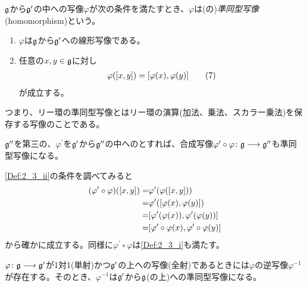 \documentclass[../main]{subfiles}
\begin{document}
\begin{definition}[準同型写像]\label{Def:2_3}
  $\mathfrak{g}$から$\mathfrak{g}^\prime$の中への写像$\varphi$が次の条件を満たすとき、$\varphi$は({}の)\emph{準同型写像}(homomorphism)という。
  \begin{enumerate}[label=(\roman*)]
    \item \label{Def:2_3_i}$\varphi$は$\mathfrak{g}$から$\mathfrak{g}^\prime$への線形写像である。
    \item \label{Def:2_3_ii}任意の$x,y\in\mathfrak{g}$に対し
      \begin{align*}
        \varphi\qty(\comm{x}{y}) = \comm{\varphi(x)}{\varphi(y)}\tag{7}\label{eq:2_(7)}
      \end{align*}
      が成立する。
  \end{enumerate}
  つまり、リー環の準同型写像とはリー環の演算(加法、乗法、スカラー乗法)を保存する写像のことである。
\end{definition}

\begin{theorem}[合成写像]
  $\mathfrak{g}^{{\prime\prime}}$を第三の{}、$\varphi^\prime$を$\mathfrak{g}^\prime$から$\mathfrak{g}^{{\prime\prime}}$の中への{}とすれば、合成写像$\varphi^\prime\circ\varphi\colon\mathfrak{g}\longrightarrow\mathfrak{g}^{{\prime\prime}}$も準同型写像になる。
\end{theorem}

\begin{Proof}
  \ref{Def:2_3_ii}の条件を調べてみると
  \begin{align*}
    \qty(\varphi^{\prime}\circ\varphi)\qty(\comm{x}{y}) =& \varphi^{\prime}\qty(\varphi\qty(\comm{x}{y}))\\
    =& \varphi^{\prime}\qty(\comm{\varphi(x)}{\varphi(y)})\\
    =& \comm{\varphi^{\prime}\qty(\varphi(x))}{\varphi^{\prime}(\varphi(y))}\\
    =& \comm{\varphi^{\prime}\circ\varphi(x)}{\varphi^{\prime}\circ\varphi(y)}
  \end{align*}
  から確かに成立する。同様に$\varphi^{\prime}\circ\varphi$は\ref{Def:2_3_i}も満たす。
\end{Proof}

\begin{theorem}[逆写像の準同型写像]
  {}$\varphi\colon\mathfrak{g}\longrightarrow\mathfrak{g}^{\prime}$が1対1(単射)かつ$\mathfrak{g}^{\prime}$の上への写像(全射)であるときには$\varphi$の逆写像$\varphi^{-1}$が存在する。そのとき、$\varphi^{-1}$は$\mathfrak{g}^{\prime}$から$\mathfrak{g}$(の上)への準同型写像になる。
\end{theorem}
\end{document}
